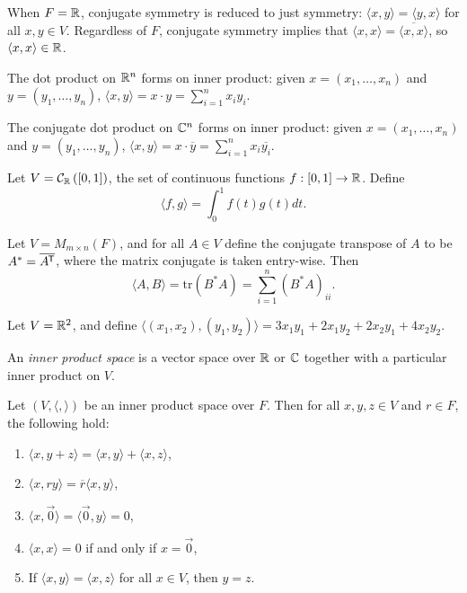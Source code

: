 \begin{rmk}
    When $F = \mathbb{R}$, conjugate symmetry is reduced to just symmetry: $\langle x, y\rangle = \langle y, x \rangle$ for all $x, y \in V$. Regardless of $F$, conjugate symmetry implies that $\langle x, x\rangle = \overline{\langle x, x\rangle}$, so $\langle x, x\rangle \in \mathbb{R}$.
\end{rmk}

\begin{exmp}
    The dot product on $\mathbb{R}^n$ forms on inner product: given $x = (x_1, \ldots, x_n)$ and $y = (y_1, \ldots, y_n)$, $\langle x, y\rangle = x \cdot y = \sum_{i=1}^{n}x_iy_i$.
\end{exmp}

\begin{exmp}
    The conjugate dot product on $\mathbb{C}^n$ forms on inner product: given $x = (x_1, \ldots, x_n)$ and $y = (y_1, \ldots, y_n)$, $\langle x, y\rangle = x \cdot \overline{y} = \sum_{i=1}^{n}x_i\overline{y_i}$.
\end{exmp}

\begin{exmp}
    Let $V = \mathcal{C}_{\mathbb{R}}\left([0, 1]\right)$, the set of continuous functions $f: [0, 1] \to \mathbb{R}$. Define
    \[\langle f, g \rangle = \int_0^1 f(t)g(t)dt.\]
\end{exmp}

\begin{exmp}
    Let $V = M_{m \times n}(F)$, and for all $A \in V$ define the conjugate transpose of $A$ to be $A^* = \overline{A^{\mkern-1.5mu\mathsf{T}}}$, where the matrix conjugate is taken entry-wise. Then
    \[\langle A, B \rangle = \textrm{tr}(B^*A) = \sum_{i=1}^{n}(B^*A)_{ii}.\]
\end{exmp}

\begin{exmp}
    Let $V = \mathbb{R}^2$, and define $\langle (x_1, x_2), (y_1, y_2) \rangle = 3x_1y_1 + 2x_1y_2 + 2x_2y_1 + 4x_2y_2$.
\end{exmp}

\begin{defn}
    An \emph{inner product space} is a vector space over $\mathbb{R}$ or $\mathbb{C}$ together with a particular inner product on $V$.
\end{defn}

\begin{thm}
    Let $(V, \langle,\rangle)$ be an inner product space over $F$. Then for all $x, y, z \in V$ and $r \in F$, the following hold:
    \begin{enumerate}[label=(\arabic*)]
        \item $\langle x, y+z \rangle = \langle x, y \rangle + \langle x, z \rangle$,
        \item $\langle x, ry \rangle = \overline{r}\langle x, y \rangle$,
        \item $\langle x, \vec{0} \rangle = \langle \vec{0}, y \rangle = 0$,
        \item $\langle x, x \rangle = 0$ if and only if $x = \vec{0}$,
        \item If $\langle x, y \rangle = \langle x, z \rangle$ for all $x \in V$, then $y = z$.
    \end{enumerate}
\end{thm}

